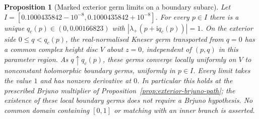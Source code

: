\documentclass[11pt]{amsart}
\newtheorem{proposition}[theorem]{Proposition}
\theoremstyle{definition}
\newcommand{\ii}{\mathrm{i}}
\begin{document}
\begin{proposition}[Marked exterior germ limits on a boundary subarc]
\label{prop:exterior-brjuno-germ-limit}
Let $I=[0.1000435842-10^{-8},0.1000435842+10^{-8}]$.
For every $p\in I$ there is a unique
$q_c(p)\in(0,0.00166823)$ with
$|\lambda_+(p+\ii q_c(p))|=1$.  On the exterior side
$0\le q<q_c(p)$, the real-normalised Kneser germ transported from
$q=0$ has a common complex height disc $V$ about $z=0$,
independent of $(p,q)$ in this parameter region.  As
$q\uparrow q_c(p)$, these germs converge locally uniformly on $V$
to nonconstant holomorphic boundary germs, uniformly in $p\in I$.
Every limit takes the value $1$ and has nonzero derivative at $0$.
In particular this holds at the prescribed Brjuno multiplier of
Proposition~\ref{prop:exterior-brjuno-path}; the existence of these
local boundary germs does not require a Brjuno hypothesis.  No
common domain containing $[0,1]$ or matching with an inner branch
is asserted.
\end{proposition}
\end{document}
